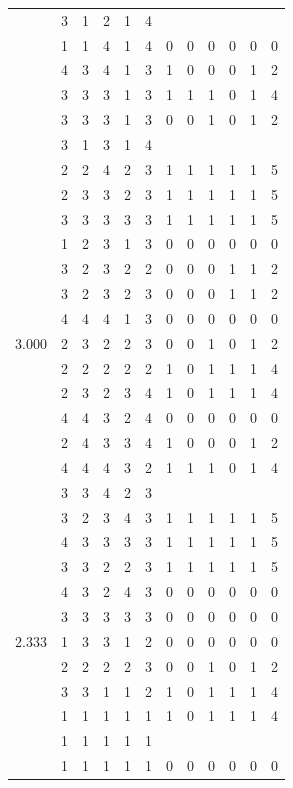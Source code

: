 \documentclass[]{book}
\theoremstyle{definition}
\theoremstyle{definition}
\theoremstyle{definition}
\theoremstyle{remark}
\begin{document}
\begin{table}
{\begin{tabular}[t]{rrrrrrrrrrrr}
 & 3 & 1 & 2 & 1 & 4 &  &  &  &  &  & \\
 & 1 & 1 & 4 & 1 & 4 & 0 & 0 & 0 & 0 & 0 & 0\\
 & 4 & 3 & 4 & 1 & 3 & 1 & 0 & 0 & 0 & 1 & 2\\
 & 3 & 3 & 3 & 1 & 3 & 1 & 1 & 1 & 0 & 1 & 4\\
 & 3 & 3 & 3 & 1 & 3 & 0 & 0 & 1 & 0 & 1 & 2\\
 & 3 & 1 & 3 & 1 & 4 &  &  &  &  &  & \\
 & 2 & 2 & 4 & 2 & 3 & 1 & 1 & 1 & 1 & 1 & 5\\
 & 2 & 3 & 3 & 2 & 3 & 1 & 1 & 1 & 1 & 1 & 5\\
 & 3 & 3 & 3 & 3 & 3 & 1 & 1 & 1 & 1 & 1 & 5\\
 & 1 & 2 & 3 & 1 & 3 & 0 & 0 & 0 & 0 & 0 & 0\\
 & 3 & 2 & 3 & 2 & 2 & 0 & 0 & 0 & 1 & 1 & 2\\
 & 3 & 2 & 3 & 2 & 3 & 0 & 0 & 0 & 1 & 1 & 2\\
 & 4 & 4 & 4 & 1 & 3 & 0 & 0 & 0 & 0 & 0 & 0\\
3.000 & 2 & 3 & 2 & 2 & 3 & 0 & 0 & 1 & 0 & 1 & 2\\
 & 2 & 2 & 2 & 2 & 2 & 1 & 0 & 1 & 1 & 1 & 4\\
 & 2 & 3 & 2 & 3 & 4 & 1 & 0 & 1 & 1 & 1 & 4\\
 & 4 & 4 & 3 & 2 & 4 & 0 & 0 & 0 & 0 & 0 & 0\\
 & 2 & 4 & 3 & 3 & 4 & 1 & 0 & 0 & 0 & 1 & 2\\
 & 4 & 4 & 4 & 3 & 2 & 1 & 1 & 1 & 0 & 1 & 4\\
 & 3 & 3 & 4 & 2 & 3 &  &  &  &  &  & \\
 & 3 & 2 & 3 & 4 & 3 & 1 & 1 & 1 & 1 & 1 & 5\\
 & 4 & 3 & 3 & 3 & 3 & 1 & 1 & 1 & 1 & 1 & 5\\
 & 3 & 3 & 2 & 2 & 3 & 1 & 1 & 1 & 1 & 1 & 5\\
 & 4 & 3 & 2 & 4 & 3 & 0 & 0 & 0 & 0 & 0 & 0\\
 & 3 & 3 & 3 & 3 & 3 & 0 & 0 & 0 & 0 & 0 & 0\\
2.333 & 1 & 3 & 3 & 1 & 2 & 0 & 0 & 0 & 0 & 0 & 0\\
 & 2 & 2 & 2 & 2 & 3 & 0 & 0 & 1 & 0 & 1 & 2\\
 & 3 & 3 & 1 & 1 & 2 & 1 & 0 & 1 & 1 & 1 & 4\\
 & 1 & 1 & 1 & 1 & 1 & 1 & 0 & 1 & 1 & 1 & 4\\
 & 1 & 1 & 1 & 1 & 1 &  &  &  &  &  & \\
 & 1 & 1 & 1 & 1 & 1 & 0 & 0 & 0 & 0 & 0 & 0\\

\end{tabular}}
\end{table}
\end{document}
